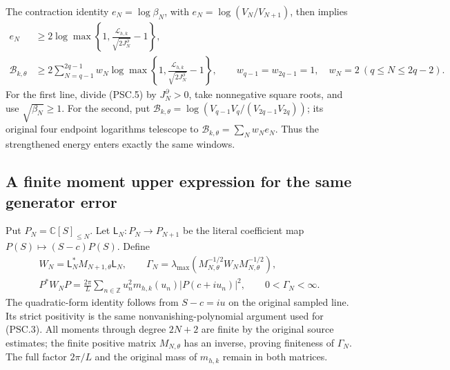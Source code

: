 The contraction identity \(e_N=\log\beta_N\), with
\(e_N=\log(V_N/V_{N+1})\), then implies
\[
 \begin{split}
 e_N&\ge
 2\log\max\left\{1,
       \frac{\mathcal L_{h,k}}{\sqrt{2J_N^\partial}}-1\right\},
 \\
 \mathcal B_{k,\theta}
 &\ge2\sum_{N=q-1}^{2q-1}w_N
 \log\max\left\{1,
       \frac{\mathcal L_{h,k}}{\sqrt{2J_N^\partial}}-1\right\},
 \qquad
 w_{q-1}=w_{2q-1}=1,\quad w_N=2\ (q\le N\le2q-2).
 \end{split}
 \tag{PSC.6}\label{eq:psc-endpoints}
\]
For the first line, divide (PSC.5) by \(J_N^\partial>0\),
take nonnegative square roots, and use \(\sqrt{\beta_N}\ge1\).
For the second, put
\(\mathcal B_{k,\theta}
=\log(V_{q-1}V_q/(V_{2q-1}V_{2q}))\);
its original four endpoint logarithms telescope
to \(\mathcal B_{k,\theta}=\sum_Nw_Ne_N\).
Thus the strengthened energy enters exactly the same windows.

\subsection{A finite moment upper expression for the same generator error}
\label{sec:psc-moments}

Put \(P_N=\mathbb C[S]_{\le N}\). Let
\(\mathsf L_N:P_N\to P_{N+1}\) be the literal coefficient map
\(P(S)\mapsto(S-c)P(S)\). Define
\[
 \begin{gathered}
 W_N=\mathsf L_N^*M_{N+1,\theta}\mathsf L_N,\qquad
 \Gamma_N=
 \lambda_{\max}(M_{N,\theta}^{-1/2}W_NM_{N,\theta}^{-1/2}),\\
 P^*W_NP=
 \frac{2\pi}{L}\sum_{n\in\mathbb Z}
 u_n^2m_{h,k}(u_n)|P(c+iu_n)|^2,\qquad
 0<\Gamma_N<\infty .
 \end{gathered}
 \tag{PSC.7}\label{eq:psc-moment}
\]
The quadratic-form identity follows from \(S-c=iu\) on the
original sampled line. Its strict positivity is the same
nonvanishing-polynomial argument used for (PSC.3).
All moments through degree \(2N+2\) are finite by the original
source estimates; the finite positive matrix \(M_{N,\theta}\)
has an inverse, proving finiteness of \(\Gamma_N\).
The full factor \(2\pi/L\) and the original mass of \(m_{h,k}\)
remain in both matrices.

